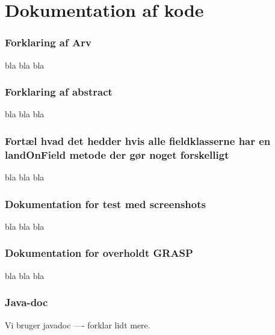 \section{Dokumentation af kode}

\subsubsection{Forklaring af Arv}
bla bla bla

\subsubsection{Forklaring af abstract}
bla bla bla

\subsubsection{Fortæl hvad det hedder hvis alle fieldklasserne har en landOnField metode der gør noget forskelligt}
bla bla bla

\subsubsection{Dokumentation for test med screenshots}
bla bla bla

\subsubsection{Dokumentation for overholdt GRASP}
bla bla bla

\subsubsection{Java-doc}
Vi bruger javadoc ---- forklar lidt mere.